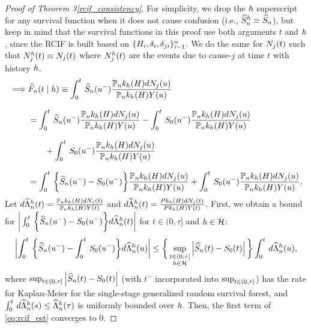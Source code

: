 {\begin{proof}[Proof of Theorem \ifnum{} 3\else \ref{rcif_consistency}\fi]
For simplicity, we drop the $h$ superscript for any survival function when it does not cause confusion (i.e., $\widehat{S}_n^h \equiv \widehat{S}_n$), but keep in mind that the survival functions in this proof use both arguments $t$ and $h$, since the RCIF is built based on $\{H_{i}, \delta_{i}, \delta_{ji}\}_{i=1}^n$. We do the same for $N_j(t)$ such that $N_j^h(t) \equiv N_j(t)$ where $N_j^h(t)$ are the events due to cause-$j$ at time $t$ with history $h$. 
\begin{align}
\label{eq:rcif_est}
\implies&\AJhat\argtgh\equiv\intzerotot \Snhat\arguleft \fracPn \notag \eqnspace
&=\intzerotot \Snhat\arguleft \fracPn 
- \intzerotot \truesurv\arguleft \fracPn \notag
\eqnspace
&\quad \quad + \intzerotot \truesurv\arguleft \fracPn \notag 
\eqnspace
&=\intzerotot \bigg\{ \Snhat\arguleft -\truesurv\arguleft \bigg\} \fracPn
+ \intzerotot \truesurv\arguleft \fracPn.
\end{align}
Let $d\widehat{\Lambda}_n^h(t) = \frac{\mathbb{P}_nk_h(H) dN_j (t)}{\mathbb{P}_nk_h(H) Y (t)}$ and
$d\widetilde{\Lambda}_n^h(t) = \frac{Pk_h(H) dN_j (t)}{Pk_h(H) Y (t)}$. First, we obtain a bound for $\bigg| \int_0^t\, \bigg\{ \widehat{S}_n(u^-) -S_0(u^-) \bigg\} d\widehat{\Lambda}_n^h(t) \bigg| $ for $t \in (0,\tau]$ and $h \in \mathcal{H}$:
\begin{align*}
\left| \int_0^t\, \bigg\{ \widehat{S}_n(u^-) - \int_0^t\, S_0(u^-) \bigg\} d\widehat{\Lambda}_n^h(u) \right| 
\leq \bigg\{ \operatorname*{\sup_{\substack{t\in(0,\tau] \\ h \in \mathcal{H}}}}
\left| \widehat{S}_n(t) -S_0(t) \right|  \bigg\}\int_0^t\, d\widehat{\Lambda}_n^h(u),
\end{align*}
where $\sup_{t\in(0,\tau]}
\left| \widehat{S}_n(t) -S_0(t) \right|$ (with $t^{-}$ incorporated into $\sup_{t\in(0,\tau]}$) has the rate for Kaplan-Meier for the single-stage generalized random survival forest, and $\int_0^t\, d\widehat{\Lambda}_n^h(s) \leq \widehat{\Lambda}_n^h(\tau)$ is uniformly bounded over $h$. Then, the first term of \cref{eq:rcif_est} converges to $0$.

\newcommand{\covrcif}{I\{s \ge t\} [N_0(s) - N_0(t^-)] - N_0(s)Y_0(t)}
\newcommand{\fracPnDivided}{\frac{\PnkH d\Nj\argu/\PnkH}{\PnkH \atrisk\argu/\PnkH}}


\end{proof}}
